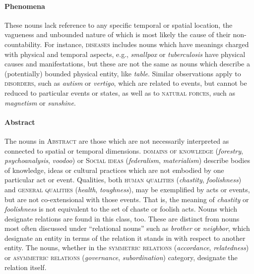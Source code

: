 \documentclass[output=paper]{langscibook}
\begin{document}
\paragraph*{Phenomena} These nouns lack reference to any specific temporal or spatial location, the vagueness and unbounded nature of which is most likely the cause of their non-countability. For instance, \textsc{diseases} includes nouns which have meanings charged with  physical and temporal aspects, e.g., \textit{smallpox} or \textit{tuberculosis} have physical causes and manifestations, but these are not the same as nouns which describe a (potentially) bounded physical entity, like \textit{table}.   Similar observations apply to  \textsc{disorders}, such as \textit{autism} or \textit{vertigo}, which are related to events, but cannot be reduced to particular events or states, as well as to \textsc{natural forces}, such as \textit{magnetism} or \textit{sunshine}.  









\paragraph*{Abstract} The nouns in \textsc{Abstract} are those which are not necessarily interpreted as connected to spatial or temporal dimensions.  \textsc{domains of knowledge} (\textit{forestry}, \textit{psychoanalysis}, \textit{voodoo}) or \textsc{Social ideas}  (\textit{federalism}, \textit{materialism}) describe bodies of knowledge, ideas or cultural practices which are not embodied by one particular act or event.  Qualities, both \textsc{human qualities} (\textit{chastity}, \textit{foolishness}) and \textsc{general qualities} (\textit{health}, \textit{toughness}), may be exemplified by acts or events, but are not co-extensional with those events.  That is, the meaning of \textit{chastity} or \textit{foolishness} is not equivalent to the set of chaste or foolish acts.  Nouns which designate relations are found in this class, too.  These are distinct from nouns most often discussed under ``relational nouns'' such as \textit{brother} or \textit{neighbor}, which designate an entity in terms of the relation it stands in with respect to another entity.  The nouns, whether in the \textsc{symmetric relations} (\textit{accordance}, \textit{relatedness}) or \textsc{asymmetric relations} (\textit{governance}, \textit{subordination}) category, designate the relation itself.  
\end{document}
